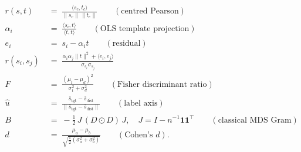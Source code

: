 \documentclass[11pt]{article}
\begin{document}
\begin{align*}
r(s, t)
  &\;=\; \frac{\langle s_c, t_c\rangle}{\|s_c\|\,\|t_c\|}
   \qquad (\text{centred Pearson}) \\
\alpha_i
  &\;=\; \frac{\langle s_i, t\rangle}{\langle t, t\rangle}
   \qquad (\text{OLS template projection}) \\
e_i
  &\;=\; s_i - \alpha_i t
   \qquad (\text{residual}) \\
r(s_i, s_j)
  &\;=\; \frac{\alpha_i\alpha_j\|t\|^2 + \langle e_i, e_j\rangle}{\sigma_{s_i}\sigma_{s_j}} \\
F
  &\;=\; \frac{(\mu_t - \mu_d)^2}{\sigma_t^2 + \sigma_d^2}
   \qquad (\text{Fisher discriminant ratio}) \\
\hat u
  &\;=\; \frac{\bar s_{\text{tgt}} - \bar s_{\text{dist}}}{\|\bar s_{\text{tgt}} - \bar s_{\text{dist}}\|}
   \qquad (\text{label axis}) \\
B
  &\;=\; -\tfrac{1}{2}\,J\,(D \odot D)\,J,\quad J = I - n^{-1}\mathbf 1\mathbf 1^\top
   \qquad (\text{classical MDS Gram}) \\
d
  &\;=\; \frac{\mu_a - \mu_b}{\sqrt{\tfrac{1}{2}(\sigma_a^2 + \sigma_b^2)}}
   \qquad (\text{Cohen's }d).
\end{align*}
\end{document}
